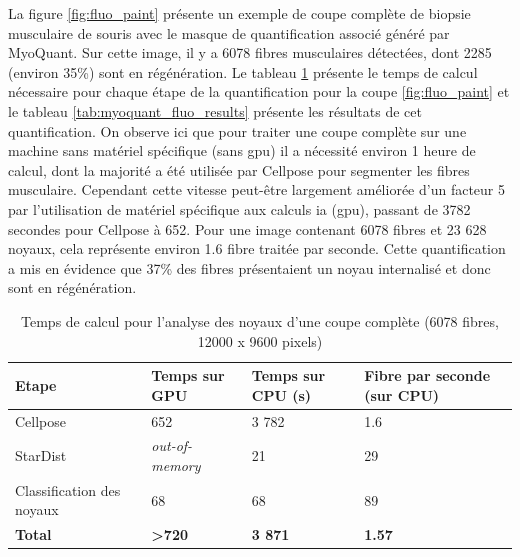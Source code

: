 La figure \ref{fig:fluo_paint} présente un exemple de coupe complète de biopsie musculaire de souris avec le masque de quantification associé généré par MyoQuant. Sur cette image, il y a 6078 fibres musculaires détectées, dont 2285 (environ 35\%) sont en régénération. Le tableau \ref{tab:myoquant_fluo_time} présente le temps de calcul nécessaire pour chaque étape de la quantification pour la coupe \ref{fig:fluo_paint} et le tableau \ref{tab:myoquant_fluo_results} présente les résultats de cet quantification. On observe ici que pour traiter  une coupe complète sur une machine sans matériel spécifique (sans \gls{gpu}) il a nécessité environ 1 heure de calcul, dont la majorité a été utilisée par Cellpose pour segmenter les fibres musculaire. Cependant cette vitesse peut-être largement améliorée d'un facteur 5 par l'utilisation de matériel spécifique aux calculs \gls{ia} (\gls{gpu}), passant de 3782 secondes pour Cellpose à 652. Pour une image contenant 6078 fibres et 23 628 noyaux, cela représente environ 1.6 fibre traitée par seconde. Cette quantification a mis en évidence que 37\% des fibres présentaient un noyau internalisé et donc sont en régénération.
\begin{table}[htbp]
\centering
\caption{Temps de calcul pour l'analyse des noyaux d'une coupe complète (6078 fibres, 12000 x 9600 pixels)}
\label{tab:myoquant_fluo_time}
\begin{tabularx}{\textwidth}{|X|X|X|X|}
\hline
\textbf{Etape} & \textbf{Temps sur GPU} & \textbf{Temps sur CPU (s)} & \textbf{Fibre par seconde (sur CPU)} \\
\toprule
Cellpose & 652 & 3 782 & 1.6 \\
\hline
StarDist & \textit{out-of-memory} & 21 & 29 \\
\hline
Classification des noyaux & 68 & 68 & 89 \\
\hline
\textbf{Total} & \textbf{>720} & \textbf{3 871} & \textbf{1.57} \\
\hline
\end{tabularx}
\end{table}

